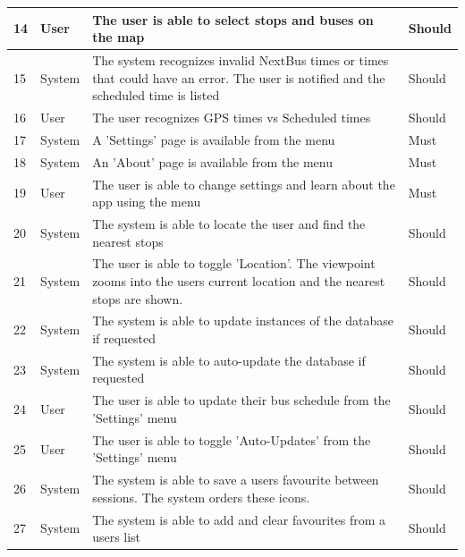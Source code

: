 \documentclass[a4paper,12pt]{article}
\begin{document}
\begin{tabular}{p{0.4cm}|p{2cm}|p{8.4cm}|p{1.7cm}}
14 & User & The user is able to select stops and buses on the map & Should \\
\hline
15 & System & The system recognizes invalid NextBus times or times that could have an error. The user is notified and the scheduled time is listed & Should \\
\hline
16 & User & The user recognizes GPS times vs Scheduled times & Should \\
\hline
17 & System & A 'Settings' page is available from the menu & Must \\
\hline
18 & System & An 'About' page is available from the menu & Must \\
\hline
19 & User & The user is able to change settings and learn about the app using the menu & Must \\
\hline
20 & System & The system is able to locate the user and find the nearest stops & Should \\
\hline
21 & System & The user is able to toggle 'Location'. The viewpoint zooms into the users current location and the nearest stops are shown. & Should \\
\hline
22 & System & The system is able to update instances of the database if requested & Should \\
\hline
23 & System & The system is able to auto-update the database if requested & Should \\
\hline
24 & User & The user is able to update their bus schedule from the 'Settings' menu & Should \\
\hline
25 & User & The user is able to toggle 'Auto-Updates' from the 'Settings' menu & Should \\
\hline
26 & System & The system is able to save a users favourite between sessions. The system orders these icons. & Should \\
\hline
27 & System & The system is able to add and clear favourites from a users list & Should \\
\hline

\end{tabular}

\pagebreak
\end{document}
